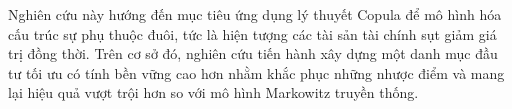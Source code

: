 Nghiên cứu này hướng đến mục tiêu ứng dụng lý thuyết Copula để mô hình hóa cấu trúc sự phụ thuộc đuôi, tức là hiện tượng các tài sản tài chính sụt giảm giá trị đồng thời. Trên cơ sở đó, nghiên cứu tiến hành xây dựng một danh mục đầu tư tối ưu có tính bền vững cao hơn nhằm khắc phục những nhược điểm và mang lại hiệu quả vượt trội hơn so với mô hình Markowitz truyền thống.
